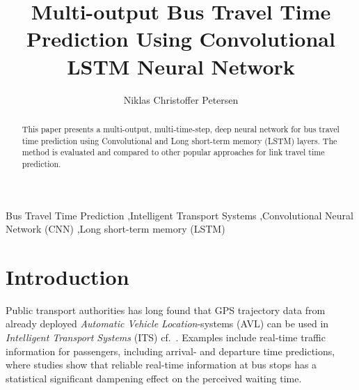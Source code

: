 \documentclass[preprint,12pt]{elsarticle}
\begin{document}
\begin{frontmatter}



\title{Multi-output Bus Travel Time Prediction Using Convolutional LSTM Neural Network}



\author{Niklas Christoffer Petersen}

\address{
  Department of Management Engineering \\
  Technical University of Denmark, 2800 Kongens Lyngby \\
  niklch@dtu.dk
}

\begin{abstract}
This paper presents a multi-output, multi-time-step, deep neural network for bus travel time prediction using Convolutional and Long short-term memory (LSTM) layers. The method is evaluated and compared to other popular approaches for link travel time prediction.
\end{abstract}

\begin{keyword}
Bus Travel Time Prediction \sep Intelligent Transport Systems \sep Convolutional Neural Network (CNN) \sep Long short-term memory (LSTM)
\end{keyword}

\end{frontmatter}
\linenumbers
\section{Introduction}
Public transport authorities has long found that GPS trajectory data from already deployed \emph{Automatic Vehicle Location}-systems (AVL) can be used in \emph{Intelligent Transport Systems} (ITS) cf.\ \cite{Tcrp48}. Examples include real-time traffic information for passengers, including arrival- and departure time predictions, where studies \cite{Fan2016} show that reliable real-time information at bus stops has a statistical significant dampening effect on the perceived waiting time.
\end{document}
